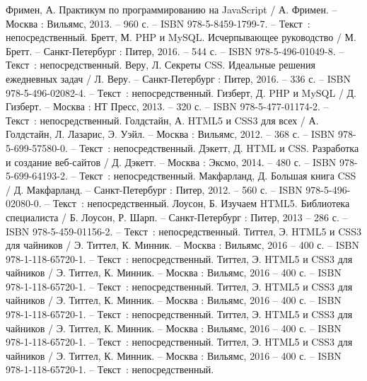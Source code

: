
\begin{thebibliography}{9}

     Фримен, А. Практикум по программированию на JavaScript / А. Фримен. – Москва : Вильямс, 2013. – 960 с. – ISBN 978-5-8459-1799-7. – Текст~: непосредственный.
     Бретт, М. PHP и MySQL. Исчерпывающее руководство / М. Бретт. – Санкт-Петербург : Питер, 2016. – 544 с. – ISBN 978-5-496-01049-8. – Текст~: непосредственный.
     Веру, Л. Секреты CSS. Идеальные решения ежедневных задач / Л. Веру. – Санкт-Петербург : Питер, 2016. – 336 с. – ISBN 978-5-496-02082-4. – Текст~: непосредственный.
    	Гизберт, Д. PHP и MySQL / Д. Гизберт. – Москва : НТ Пресс, 2013. – 320 с. – ISBN 978-5-477-01174-2. – Текст~: непосредственный.
		Голдстайн, А. HTML5 и CSS3 для всех / А. Голдстайн, Л. Лазарис, Э. Уэйл. – Москва : Вильямс, 2012. – 368 с. – ISBN 978-5-699-57580-0. – Текст~: непосредственный.
		Дэкетт, Д. HTML и CSS. Разработка и создание веб-сайтов / Д. Дэкетт. – Москва : Эксмо, 2014. – 480 с. – ISBN 978-5-699-64193-2. – Текст~: непосредственный.
		Макфарланд, Д. Большая книга CSS / Д. Макфарланд. – Санкт-Петербург : Питер, 2012. – 560 с. – ISBN 978-5-496-02080-0. – Текст~: непосредственный.
		Лоусон, Б. Изучаем HTML5. Библиотека специалиста / Б. Лоусон, Р. Шарп. – Санкт-Петербург : Питер, 2013 – 286 с. – ISBN 978-5-459-01156-2. – Текст~: непосредственный.
		Титтел, Э. HTML5 и CSS3 для чайников / Э. Титтел, К. Минник. – Москва : Вильямс, 2016 – 400 с. – ISBN 978-1-118-65720-1. – Текст~: непосредственный.    
		Титтел, Э. HTML5 и CSS3 для чайников / Э. Титтел, К. Минник. – Москва : Вильямс, 2016 – 400 с. – ISBN 978-1-118-65720-1. – Текст~: непосредственный.    
		Титтел, Э. HTML5 и CSS3 для чайников / Э. Титтел, К. Минник. – Москва : Вильямс, 2016 – 400 с. – ISBN 978-1-118-65720-1. – Текст~: непосредственный.    
		Титтел, Э. HTML5 и CSS3 для чайников / Э. Титтел, К. Минник. – Москва : Вильямс, 2016 – 400 с. – ISBN 978-1-118-65720-1. – Текст~: непосредственный.    
		Титтел, Э. HTML5 и CSS3 для чайников / Э. Титтел, К. Минник. – Москва : Вильямс, 2016 – 400 с. – ISBN 978-1-118-65720-1. – Текст~: непосредственный.
\end{thebibliography}
